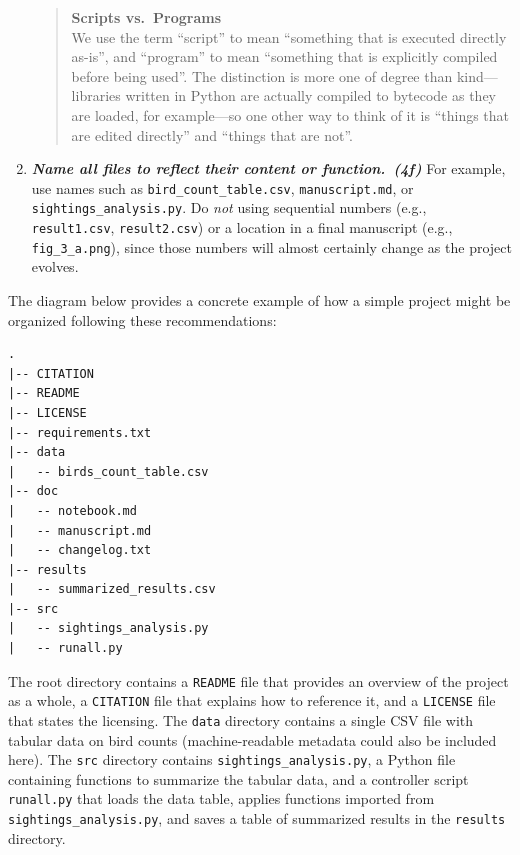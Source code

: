 \documentclass[10pt,letterpaper]{article}
\newcommand{\practice}[2]{\textbf{\emph{{#2}~({#1})}}}
\begin{document}
\begin{enumerate}
  \begin{quote}
    \noindent \textbf{Scripts vs.\ Programs}
    \\
    We use the term ``script'' to mean ``something that is executed
    directly as-is'', and ``program'' to mean ``something that is
    explicitly compiled before being used''.  The distinction is more
    one of degree than kind---libraries written in Python are actually
    compiled to bytecode as they are loaded, for example---so one
    other way to think of it is ``things that are edited directly''
    and ``things that are not''.
  \end{quote}

\item

  \practice{4f}{Name all files to reflect their content or function.}
  For example, use names such as \texttt{bird\_count\_table.csv},
  \texttt{manuscript.md}, or \texttt{sightings\_analysis.py}.  Do
  \emph{not} using sequential numbers (e.g., \texttt{result1.csv},
  \texttt{result2.csv}) or a location in a final manuscript (e.g.,
  \texttt{fig\_3\_a.png}), since those numbers will almost certainly
  change as the project evolves.

\end{enumerate}

The diagram below provides a concrete example of how a simple project
might be organized following these recommendations:

{\small
\begin{verbatim}
.
|-- CITATION
|-- README
|-- LICENSE
|-- requirements.txt
|-- data
|   -- birds_count_table.csv
|-- doc
|   -- notebook.md
|   -- manuscript.md
|   -- changelog.txt
|-- results
|   -- summarized_results.csv
|-- src
|   -- sightings_analysis.py
|   -- runall.py
\end{verbatim}
}

The root directory contains a \texttt{README} file that provides an
overview of the project as a whole, a \texttt{CITATION} file that
explains how to reference it, and a \texttt{LICENSE} file that states the
licensing. The \texttt{data} directory contains a
single CSV file with tabular data on bird counts (machine-readable
metadata could also be included here). The \texttt{src} directory
contains \texttt{sightings\_analysis.py}, a Python file containing
functions to summarize the tabular data, and a controller script
\texttt{runall.py} that loads the data table, applies functions
imported from \texttt{sightings\_analysis.py}, and saves a table of
summarized results in the \texttt{results} directory.
\end{document}
